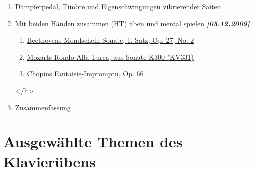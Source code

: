 \begin{enumerate}
 \item \hyperref[c1ii24]{Dämpferpedal, Timbre und Eigenschwingungen vibrierender Saiten}
 \item \hyperref[c1ii25]{Mit beiden Händen zusammen (HT) üben und mental spielen} \textbf{\textit{[05.12.2009]}}
  \begin{enumerate}[label={\alph*.}] 
   <li>\hyperref[c1ii25a]{Einführung}
   \item \hyperref[c1ii25b]{Beethovens Mondschein-Sonate, 1. Satz, Op. 27, No. 2}
   \item \hyperref[c1ii25c]{Mozarts Rondo Alla Turca, aus Sonate K300 (KV331)}
   \item \hyperref[c1ii25d]{Chopins Fantaisie-Impromptu, Op. 66}
  \end{enumerate}
 </li>
 \item \hyperref[c1ii26]{Zusammenfassung}
 \end{enumerate}

\section{Ausgewählte Themen des Klavierübens}

